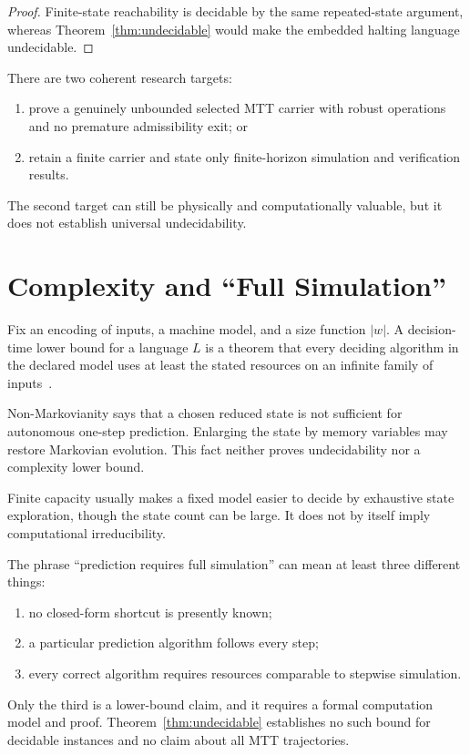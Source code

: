 \documentclass[11pt]{article}
\begin{document}
\begin{proof}
Finite-state reachability is decidable by the same repeated-state argument,
whereas Theorem~\ref{thm:undecidable} would make the embedded halting language
undecidable.
\end{proof}

There are two coherent research targets:
\begin{enumerate}
\item prove a genuinely unbounded selected MTT carrier with robust operations
and no premature admissibility exit; or
\item retain a finite carrier and state only finite-horizon simulation and
verification results.
\end{enumerate}
The second target can still be physically and computationally valuable, but it
does not establish universal undecidability.

\section{Complexity and ``Full Simulation''}

\begin{definition}
Fix an encoding of inputs, a machine model, and a size function $|w|$.  A
decision-time lower bound for a language $L$ is a theorem that every deciding
algorithm in the declared model uses at least the stated resources on an
infinite family of inputs~\cite{HartmanisStearns}.
\end{definition}

\begin{remark}
Non-Markovianity says that a chosen reduced state is not sufficient for
autonomous one-step prediction.  Enlarging the state by memory variables may
restore Markovian evolution.  This fact neither proves undecidability nor a
complexity lower bound.
\end{remark}

\begin{remark}
Finite capacity usually makes a fixed model easier to decide by exhaustive
state exploration, though the state count can be large.  It does not by
itself imply computational irreducibility.
\end{remark}

The phrase ``prediction requires full simulation'' can mean at least three
different things:
\begin{enumerate}
\item no closed-form shortcut is presently known;
\item a particular prediction algorithm follows every step;
\item every correct algorithm requires resources comparable to stepwise
simulation.
\end{enumerate}
Only the third is a lower-bound claim, and it requires a formal computation
model and proof.  Theorem~\ref{thm:undecidable} establishes no such bound for
decidable instances and no claim about all MTT trajectories.
\end{document}
